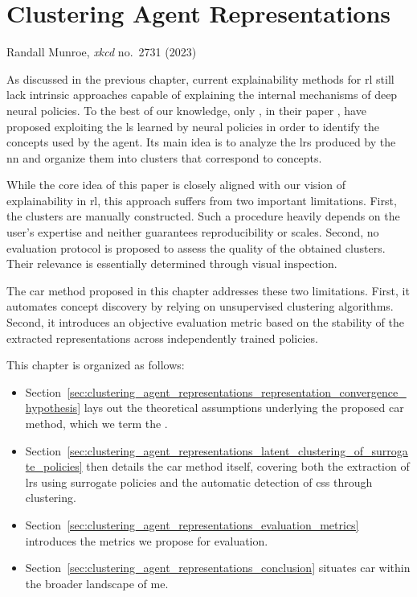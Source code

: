 \chapter{Clustering Agent Representations}
\label{chap:clustering_agent_representations}

{Randall Munroe, \textit{xkcd} no.~2731 (2023)~\parencite{munroe2023kmeans}}

\chaptercontents

\glsresetall

As discussed in the previous chapter, current explainability methods for \gls{rl} still lack intrinsic approaches capable of explaining the internal mechanisms of deep neural policies.
To the best of our knowledge, only \textcite{zahavy2017graying}, in their paper , have proposed exploiting the \gls{ls} learned by neural policies in order to identify the concepts used by the agent.
Its main idea is to analyze the \glspl{lr} produced by the \gls{nn} and organize them into clusters that correspond to concepts.

While the core idea of this paper is closely aligned with our vision of explainability in \gls{rl}, this approach suffers from two important limitations.
First, the clusters are manually constructed.
Such a procedure heavily depends on the user's expertise and neither guarantees reproducibility or scales.
Second, no evaluation protocol is proposed to assess the quality of the obtained clusters.
Their relevance is essentially determined through visual inspection.

The \gls{car} method proposed in this chapter addresses these two limitations.
First, it automates concept discovery by relying on unsupervised clustering algorithms.
Second, it introduces an objective evaluation metric based on the stability of the extracted representations across independently trained policies.

This chapter is organized as follows:
\begin{itemize}
    \item Section~\ref{sec:clustering_agent_representations_representation_convergence_hypothesis} lays out the theoretical assumptions underlying the proposed \gls{car} method, which we term the \RepresentationConvergenceHypothesisName.
    \item Section~\ref{sec:clustering_agent_representations_latent_clustering_of_surrogate_policies} then details the \gls{car} method itself, covering both the extraction of \glspl{lr} using surrogate policies and the automatic detection of \glspl{cs} through clustering.
    \item Section~\ref{sec:clustering_agent_representations_evaluation_metrics} introduces the metrics we propose for evaluation.
    \item Section~\ref{sec:clustering_agent_representations_conclusion} situates \gls{car} within the broader landscape of \gls{me}.
\end{itemize}

